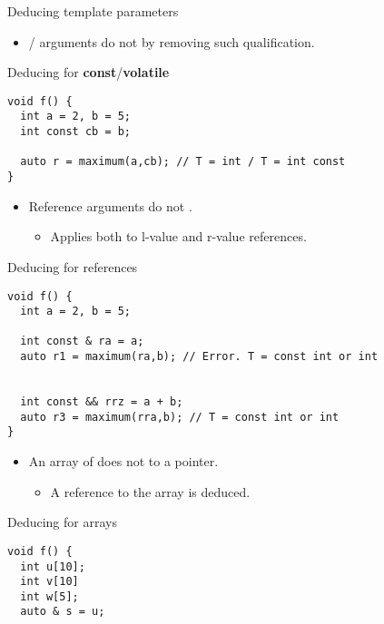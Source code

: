 \begin{frame}{Deducing template parameters}

\begin{itemize}
  \item {}/ arguments do not 
        by removing such qualification.
\end{itemize}

\begin{block}{Deducing for \textbf{const}/\textbf{volatile}}
\begin{lstlisting}
void f() {
  int a = 2, b = 5;
  int const cb = b;

  auto r = maximum(a,cb); // T = int / T = int const
}
\end{lstlisting}
\end{block}

\framebreak

\begin{itemize}
  \item Reference arguments do not .
    \begin{itemize}
      \item Applies both to l-value and r-value references.
    \end{itemize}
\end{itemize}

\begin{block}{Deducing for references}
\begin{lstlisting}
void f() {
  int a = 2, b = 5;

  int const & ra = a;
  auto r1 = maximum(ra,b); // Error. T = const int or int


  int const && rrz = a + b;
  auto r3 = maximum(rra,b); // T = const int or int
}

\end{lstlisting}
\end{block}

\framebreak

\begin{itemize}
  \item An array of  does not  to a pointer.
    \begin{itemize}
      \item A reference to the array is deduced.
    \end{itemize}
\end{itemize}

\begin{block}{Deducing for arrays}
\begin{lstlisting}
void f() {
  int u[10];
  int v[10]
  int w[5];
  auto & s = u;


\end{lstlisting}
\end{block}
\end{frame}
